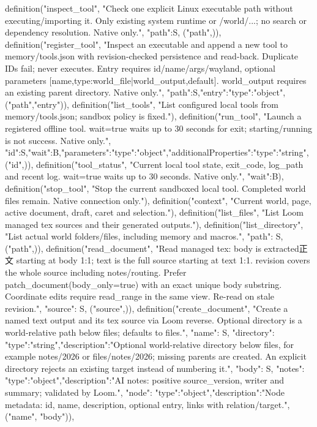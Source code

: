     definition("inspect_tool", "Check one explicit Linux executable path without executing/importing it. Only existing system runtime or /world/...; no search or dependency resolution. Native only.", {"path":S}, ("path",)),
    definition("register_tool", "Inspect an executable and append a new tool to memory/tools.json with revision-checked persistence and read-back. Duplicate IDs fail; never executes. Entry requires id/name/args/wayland, optional parameters [{name,type:world_file|world_output,default}]. world_output requires an existing parent directory. Native only.", {"path":S,"entry":{"type":"object"}}, ("path","entry")),
    definition("list_tools", "List configured local tools from memory/tools.json; sandbox policy is fixed."),
    definition("run_tool", "Launch a registered offline tool. wait=true waits up to 30 seconds for exit; starting/running is not success. Native only.", {"id":S,"wait":B,"parameters":{"type":"object","additionalProperties":{"type":"string"}}}, ("id",)),
    definition("tool_status", "Current local tool state, exit_code, log_path and recent log. wait=true waits up to 30 seconds. Native only.", {"wait":B}),
    definition("stop_tool", "Stop the current sandboxed local tool. Completed world files remain. Native connection only."),
    definition("context", "Current world, page, active document, draft, caret and selection."),
    definition("list_files", "List Loom managed tex sources and their generated outputs."),
    definition("list_directory", "List actual world folders/files, including memory and macros.", {"path": S}, ("path",)),
    definition("read_document", "Read managed tex: body is extracted正文 starting at body 1:1; text is the full source starting at text 1:1. revision covers the whole source including notes/routing. Prefer patch_document(body_only=true) with an exact unique body substring. Coordinate edits require read_range in the same view. Re-read on stale revision.", {"source": S}, ("source",)),
    definition("create_document", "Create a named text output and its tex source via Loom reverse. Optional directory is a world-relative path below files; defaults to files.", {"name": S, "directory": {"type":"string","description":"Optional world-relative directory below files, for example notes/2026 or files/notes/2026; missing parents are created. An explicit directory rejects an existing target instead of numbering it."}, "body": S, "notes": {"type":"object","description":"AI notes: positive source_version, writer and summary; validated by Loom."}, "node": {"type":"object","description":"Node metadata: id, name, description, optional entry, links with relation/target."}}, ("name", "body")),
